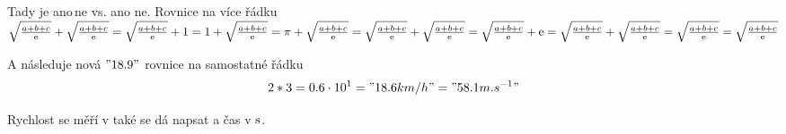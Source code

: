 \documentclass[twoside]{fksserie}
\begin{document}
\maketitle

%

\problemsheading %


\solutionheading %

Tady je ano\,ne vs. ano ne. Rovnice na více řádku
$
\sqrt{\frac{a+b+c}{\mathrm{e}}} + \sqrt{\frac{a+b+c}{\mathrm{e}}} =
\sqrt{\frac{a+b+c}{\mathrm{e}}} + 1 =
1 + \sqrt{\frac{a+b+c}{\mathrm{e}}} =
\pi + \sqrt{\frac{a+b+c}{\mathrm{e}}} =
\sqrt{\frac{a+b+c}{\mathrm{e}}} + \sqrt{\frac{a+b+c}{\mathrm{e}}} =
\sqrt{\frac{a+b+c}{\mathrm{e}}} + \mathrm{e} =
\sqrt{\frac{a+b+c}{\mathrm{e}}} + \sqrt{\frac{a+b+c}{\mathrm{e}}} =
\sqrt{\frac{a+b+c}{\mathrm{e}}} = \sqrt{\frac{a+b+c}{\mathrm{e}}}
$

A následuje nová $"18.9"$ rovnice na samostatné řádku
$$
  2*3 = 0.6\cdot 10^{1} = "18.6 km/h" = "58.1 m.s^{-1}"
$$

Rychlost se měří v  také se dá napsat  a čas v $\jd{s}$.

\end{document}
